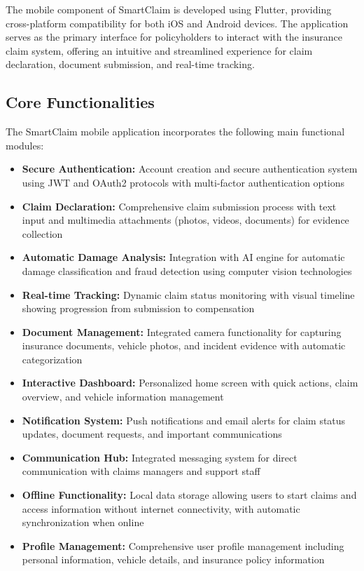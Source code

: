 \documentclass[12pt,a4paper]{report}
\begin{document}
The mobile component of SmartClaim is developed using Flutter, providing cross-platform compatibility for both iOS and Android devices. The application serves as the primary interface for policyholders to interact with the insurance claim system, offering an intuitive and streamlined experience for claim declaration, document submission, and real-time tracking.

\subsection{Core Functionalities}

The SmartClaim mobile application incorporates the following main functional modules:

\begin{itemize}
    \item \textbf{Secure Authentication:} Account creation and secure authentication system using JWT and OAuth2 protocols with multi-factor authentication options
    
    \item \textbf{Claim Declaration:} Comprehensive claim submission process with text input and multimedia attachments (photos, videos, documents) for evidence collection
    
    \item \textbf{Automatic Damage Analysis:} Integration with AI engine for automatic damage classification and fraud detection using computer vision technologies
    
    \item \textbf{Real-time Tracking:} Dynamic claim status monitoring with visual timeline showing progression from submission to compensation
    
    \item \textbf{Document Management:} Integrated camera functionality for capturing insurance documents, vehicle photos, and incident evidence with automatic categorization
    
    \item \textbf{Interactive Dashboard:} Personalized home screen with quick actions, claim overview, and vehicle information management
    
    \item \textbf{Notification System:} Push notifications and email alerts for claim status updates, document requests, and important communications
    
    \item \textbf{Communication Hub:} Integrated messaging system for direct communication with claims managers and support staff
    
    \item \textbf{Offline Functionality:} Local data storage allowing users to start claims and access information without internet connectivity, with automatic synchronization when online
    
    \item \textbf{Profile Management:} Comprehensive user profile management including personal information, vehicle details, and insurance policy information
\end{itemize}
\end{document}
